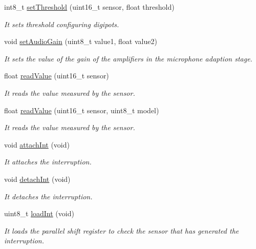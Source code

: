 \begin{DoxyCompactItemize}
int8\+\_\+t \hyperlink{class_wasp_sensor_cities_a3a2cae0d42f7d34b6665874638be9668}{set\+Threshold} (uint16\+\_\+t sensor, float threshold)
\begin{DoxyCompactList}\small\item\em It sets threshold configuring digipots. \end{DoxyCompactList}\item 
void \hyperlink{class_wasp_sensor_cities_a0f7694be4c8347702ac5007e8b86e01f}{set\+Audio\+Gain} (uint8\+\_\+t value1, float value2)
\begin{DoxyCompactList}\small\item\em It sets the value of the gain of the amplifiers in the microphone adaption stage. \end{DoxyCompactList}\item 
float \hyperlink{class_wasp_sensor_cities_a4528e9a9bbd5c90e63aa0a6b51cdfba2}{read\+Value} (uint16\+\_\+t sensor)
\begin{DoxyCompactList}\small\item\em It reads the value measured by the sensor. \end{DoxyCompactList}\item 
float \hyperlink{class_wasp_sensor_cities_a9b8842ffe856a3325488f3d4c710c633}{read\+Value} (uint16\+\_\+t sensor, uint8\+\_\+t model)
\begin{DoxyCompactList}\small\item\em It reads the value measured by the sensor. \end{DoxyCompactList}\item 
void \hyperlink{class_wasp_sensor_cities_a244f02367345dd1c828ff023d8b7ff49}{attach\+Int} (void)
\begin{DoxyCompactList}\small\item\em It attaches the interruption. \end{DoxyCompactList}\item 
void \hyperlink{class_wasp_sensor_cities_a6c4a172eeea66e9dc0461cbc6028641d}{detach\+Int} (void)
\begin{DoxyCompactList}\small\item\em It detaches the interruption. \end{DoxyCompactList}\item 
uint8\+\_\+t \hyperlink{class_wasp_sensor_cities_a97f0737c3478a7b8353abbc72a537317}{load\+Int} (void)
\begin{DoxyCompactList}\small\item\em It loads the parallel shift register to check the sensor that has generated the interruption. \end{DoxyCompactList}\end{DoxyCompactItemize}

